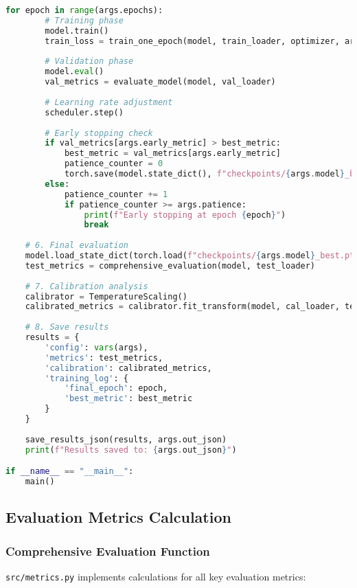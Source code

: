 \begin{lstlisting}[language=Python,caption=Training and Evaluation Main Program Structure]
    for epoch in range(args.epochs):
        # Training phase
        model.train()
        train_loss = train_one_epoch(model, train_loader, optimizer, args)
        
        # Validation phase
        model.eval()
        val_metrics = evaluate_model(model, val_loader)
        
        # Learning rate adjustment
        scheduler.step()
        
        # Early stopping check
        if val_metrics[args.early_metric] > best_metric:
            best_metric = val_metrics[args.early_metric]
            patience_counter = 0
            torch.save(model.state_dict(), f"checkpoints/{args.model}_best.pth")
        else:
            patience_counter += 1
            if patience_counter >= args.patience:
                print(f"Early stopping at epoch {epoch}")
                break
    
    # 6. Final evaluation
    model.load_state_dict(torch.load(f"checkpoints/{args.model}_best.pth"))
    test_metrics = comprehensive_evaluation(model, test_loader)
    
    # 7. Calibration analysis
    calibrator = TemperatureScaling()
    calibrated_metrics = calibrator.fit_transform(model, cal_loader, test_loader)
    
    # 8. Save results
    results = {
        'config': vars(args),
        'metrics': test_metrics,
        'calibration': calibrated_metrics,
        'training_log': {
            'final_epoch': epoch,
            'best_metric': best_metric
        }
    }
    
    save_results_json(results, args.out_json)
    print(f"Results saved to: {args.out_json}")

if __name__ == "__main__":
    main()
\end{lstlisting}

\subsection{Evaluation Metrics Calculation}
\label{subsec:metrics_implementation}

\subsubsection{Comprehensive Evaluation Function}
\texttt{src/metrics.py} implements calculations for all key evaluation metrics:

